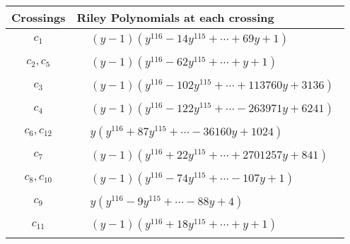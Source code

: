 \documentclass[1p]{elsarticle_modified}
\theoremstyle{definition}
\begin{document}
\begin{tabular}{m{50pt}|m{274pt}}
Crossings & \hspace{64pt}Riley Polynomials at each crossing \\
\hline $$\begin{aligned}c_{1}\end{aligned}$$&$\begin{aligned}
&(y-1)(y^{116}-14 y^{115}+\cdots+69 y+1)
\end{aligned}$\\
\hline $$\begin{aligned}c_{2},c_{5}\end{aligned}$$&$\begin{aligned}
&(y-1)(y^{116}-62 y^{115}+\cdots+y+1)
\end{aligned}$\\
\hline $$\begin{aligned}c_{3}\end{aligned}$$&$\begin{aligned}
&(y-1)(y^{116}-102 y^{115}+\cdots+113760 y+3136)
\end{aligned}$\\
\hline $$\begin{aligned}c_{4}\end{aligned}$$&$\begin{aligned}
&(y-1)(y^{116}-122 y^{115}+\cdots-263971 y+6241)
\end{aligned}$\\
\hline $$\begin{aligned}c_{6},c_{12}\end{aligned}$$&$\begin{aligned}
&y(y^{116}+87 y^{115}+\cdots-36160 y+1024)
\end{aligned}$\\
\hline $$\begin{aligned}c_{7}\end{aligned}$$&$\begin{aligned}
&(y-1)(y^{116}+22 y^{115}+\cdots+2701257 y+841)
\end{aligned}$\\
\hline $$\begin{aligned}c_{8},c_{10}\end{aligned}$$&$\begin{aligned}
&(y-1)(y^{116}-74 y^{115}+\cdots-107 y+1)
\end{aligned}$\\
\hline $$\begin{aligned}c_{9}\end{aligned}$$&$\begin{aligned}
&y(y^{116}-9 y^{115}+\cdots-88 y+4)
\end{aligned}$\\
\hline $$\begin{aligned}c_{11}\end{aligned}$$&$\begin{aligned}
&(y-1)(y^{116}+18 y^{115}+\cdots+y+1)
\end{aligned}$\\
\hline
\end{tabular}
\vskip 2pc
\end{document}

